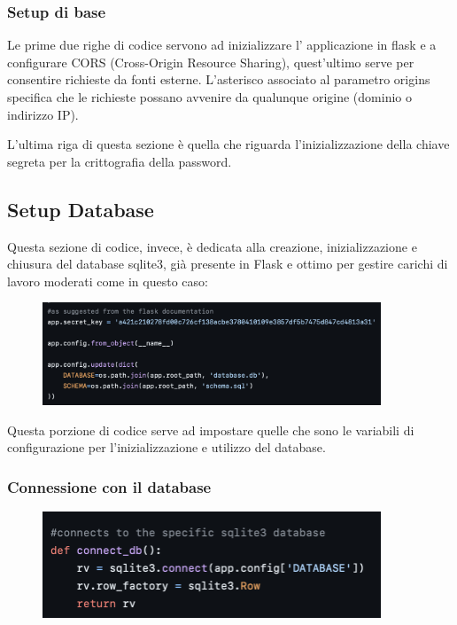 \documentclass{article}
\begin{document}
\subsubsection{Setup di base}
Le prime due righe di codice servono ad inizializzare l' applicazione in flask e a configurare CORS (Cross-Origin Resource Sharing), quest'ultimo serve per consentire richieste da fonti esterne. 
L’asterisco associato al parametro origins specifica che le richieste possano avvenire da qualunque origine (dominio o indirizzo IP).

L’ultima riga di questa sezione è quella che riguarda l’inizializzazione della chiave segreta per la crittografia della password.

\subsection{Setup Database}
Questa sezione di codice, invece, è dedicata alla creazione, inizializzazione e chiusura del database sqlite3, già presente in Flask e ottimo per gestire carichi di lavoro moderati come in questo caso:
\begin{figure}[H]
    \centering
    \includegraphics[width=0.9\textwidth]{images/setup_database1.png}
\end{figure}

Questa porzione di codice serve ad impostare quelle che sono le variabili di configurazione per l’inizializzazione e utilizzo del database.

\subsubsection{Connessione con il database}
\begin{figure}[H]
    \centering
    \includegraphics[width=0.9\textwidth]{images/connessione_db.png}
\end{figure}
\end{document}
